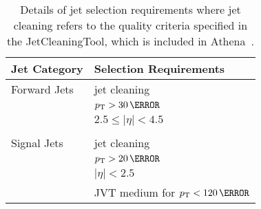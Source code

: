 \begin{table}[h]
  \centering
  \begin{tabular}{l l}
    \toprule
    {\bfseries Jet Category} & {\bfseries Selection Requirements} \\
    \midrule
    Forward Jets & jet cleaning \\
    & $p_{\mathrm{T}} > 30\,\mathrm{\GeV}$ \\
    & $2.5 \leq \left|\eta\right| < 4.5$ \\ 
    &\\
    Signal Jets & jet cleaning \\
    & $p_{\mathrm{T}} > 20\,\mathrm{\GeV}$ \\
    & $ \left|\eta\right| < 2.5$ \\ 
    & JVT medium for $p_{\mathrm{T}} < 120\,\mathrm{\GeV}$ \\
    \bottomrule
  \end{tabular}
  \caption[Jet selection requirements.]{Details of jet selection requirements
    where jet cleaning refers to the quality criteria specified in the
    JetCleaningTool, which is included in
    Athena~\cite{ATLAS-CONF-2015-029,Gonski:2272136}.}
  \label{tab:jet-cats}
\end{table}